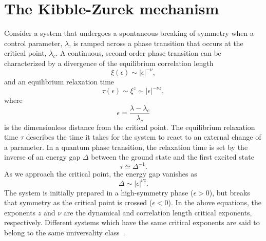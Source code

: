 \section{The Kibble-Zurek mechanism}\label{sec: the-KZM}
Consider a system that undergoes a spontaneous breaking of symmetry when a
control parameter, \( \lambda \), is ramped across a phase transition that
occurs at the critical point, \( \lambda_c \).
A continuous, second-order phase transition can be characterized by a divergence
of the equilibrium correlation length~\cite{DelCampo2014}
\begin{equation}
    \xi(\epsilon) \sim |\epsilon|^{-\nu},
\end{equation}
and an equilibrium relaxation time
\begin{equation}
    \tau(\epsilon) \sim \xi^z \sim |\epsilon|^{-\nu z},
    \label{eq: equil-relax-time}
\end{equation}
where
\begin{equation}
    \epsilon = \frac{\lambda - \lambda_c}{\lambda_c}
\end{equation}
is the dimensionless distance from the critical point.
The equilibrium relaxation time \( \tau \) describes the time it takes for the
system to react to an external change of a parameter.
In a quantum phase transition, the relaxation time is set by the inverse of an
energy gap \( \Delta \) between the ground state and the first excited
state~\cite{Zurek2005, Damski2006}
\begin{equation}
    \tau \simeq \Delta^{-1}.
\end{equation}
As we approach the critical point, the energy gap vanishes as
\begin{equation}\label{eq: delta-epsilon-relation}
    \Delta \sim |\epsilon|^{\nu z}.
\end{equation}
The system is initially prepared in a high-symmetry phase (\(  \epsilon > 0 \)),
but breaks that symmetry as the critical point is crossed (\(  \epsilon < 0 \)).
In the above equations, the exponents \(  z \) and \( \nu \) are the dynamical
and correlation length critical exponents, respectively.
Different systems which have the same critical exponents are said to belong
to the same universality class~\cite{Sachdev2011,DelCampo2014}.

